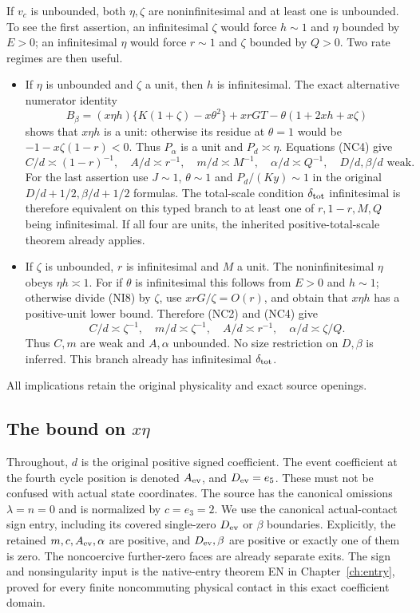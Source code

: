 If $v_c$ is unbounded, both $\eta,\zeta$ are noninfinitesimal and
at least one is unbounded. To see the first assertion, an infinitesimal
$\zeta$ would force $h\sim1$ and $\eta$ bounded by $E>0$;
an infinitesimal $\eta$ would force $r\sim1$ and $\zeta$ bounded
by $Q>0$. Two rate regimes are then useful.
\begin{itemize}
\item If $\eta$ is unbounded and $\zeta$ a unit, then $h$ is
infinitesimal. The exact alternative numerator identity
\[
 B_\beta=(x\eta h)\{K(1+\zeta)-x\theta^2\}
             +xrGT-\theta(1+2xh+x\zeta)             \tag{NI8}
\]
shows that $x\eta h$ is a unit: otherwise its residue at
$\theta=1$ would be $-1-x\zeta(1-r)<0$.
Thus $P_\alpha$ is a unit and $P_d\asymp\eta$.
Equations (NC4) give
\[
 C/d\asymp(1-r)^{-1},\quad A/d\asymp r^{-1},\quad
 m/d\asymp M^{-1},\quad\alpha/d\asymp Q^{-1},
 \quad D/d,\beta/d\text{ weak}.                    \tag{NI9}
\]
For the last assertion use $J\sim1$, $\theta\sim1$ and
$P_d/(Ky)\sim1$ in the original $D/d+1/2,\beta/d+1/2$
formulas. The total-scale condition $\delta_{\rm tot}$ infinitesimal
is therefore equivalent on this typed branch to at least one of
$r,1-r,M,Q$ being infinitesimal. If all four are units, the inherited
positive-total-scale theorem already applies.

\item If $\zeta$ is unbounded, $r$ is infinitesimal and $M$ a
unit. The noninfinitesimal $\eta$ obeys $\eta h\asymp1$.
For if $\theta$ is infinitesimal this follows from $E>0$ and
$h\sim1$; otherwise divide (NI8) by $\zeta$, use
$xrG/\zeta=O(r)$, and obtain that $x\eta h$ has a positive-unit
lower bound. Therefore (NC2) and (NC4) give
\[
 C/d\asymp\zeta^{-1},\quad m/d\asymp\zeta^{-1},\quad
 A/d\asymp r^{-1},\quad\alpha/d\asymp\zeta/Q.
 \tag{NI10}
\]
Thus $C,m$ are weak and $A,\alpha$ unbounded. No size restriction
on $D,\beta$ is inferred. This branch already has infinitesimal
$\delta_{\rm tot}$.
\end{itemize}
All implications retain the original physicality and exact source openings.



\subsection{The bound on $x\eta$}

\label{component:pa133fae35e52}

Throughout, $d$ is the original positive signed coefficient. The event
coefficient at the fourth cycle position is denoted $A_{\rm ev}$, and
$D_{\rm ev}=e_5$. These must not be confused with actual state coordinates.
The source has the canonical omissions $\lambda=n=0$ and is normalized
by $c=e_3=2$. We use the canonical actual-contact sign entry, including
its covered single-zero $D_{\rm ev}$ or $\beta$ boundaries. Explicitly,
the retained $m,c,A_{\rm ev},\alpha$ are positive, and $D_{\rm ev},\beta$
are positive or exactly one of them is zero. The noncoercive further-zero
faces are already separate exits. The sign and nonsingularity input is the native-entry theorem EN in Chapter~\ref{ch:entry}, proved for every finite noncommuting physical contact in this exact coefficient domain.

